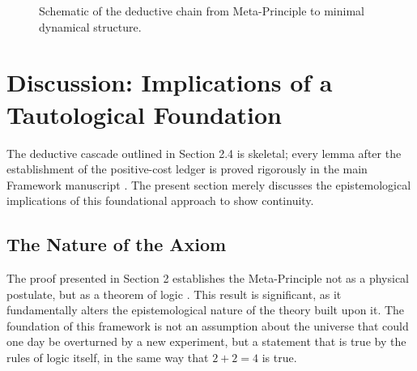 \documentclass[axioms,article,submit,pdftex,oneauthor]{Definitions/mdpi}
\begin{document}
\begin{figure}[H]
\centering
{}
\caption{Schematic of the deductive chain from Meta-Principle to minimal dynamical structure.}
\label{fig:minimal_structure_sketch}
\end{figure}

\section{Discussion: Implications of a Tautological Foundation}
The deductive cascade outlined in Section 2.4 is skeletal; every lemma after the establishment of the positive-cost ledger is proved rigorously in the main Framework manuscript \cite{washburn2025zenodo}. The present section merely discusses the epistemological implications of this foundational approach to show continuity.

\subsection{The Nature of the Axiom}
The proof presented in Section 2 establishes the Meta-Principle not as a physical postulate, but as a theorem of logic \cite{russell1919introduction}. This result is significant, as it fundamentally alters the epistemological nature of the theory built upon it. The foundation of this framework is not an assumption about the universe that could one day be overturned by a new experiment, but a statement that is true by the rules of logic itself, in the same way that \(2+2=4\) is true.
\end{document}
